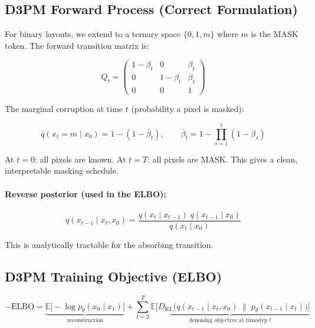 \documentclass[12pt,a4paper]{article}
\theoremstyle{definition}
\theoremstyle{plain}
\theoremstyle{remark}
\begin{document}
\subsection{D3PM Forward Process (Correct Formulation)}

For binary layouts, we extend to a ternary space $\{0, 1, m\}$ where $m$ is the MASK
token.
The forward transition matrix is:

\begin{equation}
  Q_t =
  \begin{pmatrix}
    1 - \beta_t & 0           & \beta_t \\
    0           & 1 - \beta_t & \beta_t \\
    0           & 0           & 1
  \end{pmatrix}
  \label{eq:Qt}
\end{equation}

The marginal corruption at time $t$ (probability a pixel is masked):

\begin{equation}
  \bar{q}(x_t = m \mid x_0) = 1 - (1 - \bar{\beta}_t),
  \qquad
  \bar{\beta}_t = 1 - \prod_{s=1}^t (1 - \beta_s)
  \label{eq:marginal}
\end{equation}

At $t = 0$: all pixels are known.
At $t = T$: all pixels are MASK.
This gives a clean, interpretable masking schedule.

\paragraph{Reverse posterior (used in the ELBO):}

\begin{equation}
  q(x_{t-1} \mid x_t, x_0)
  = \frac{q(x_t \mid x_{t-1})\; q(x_{t-1} \mid x_0)}{q(x_t \mid x_0)}
  \label{eq:reverse_posterior}
\end{equation}

This is analytically tractable for the absorbing transition.

\subsection{D3PM Training Objective (ELBO)}

\begin{equation}
  -\mathrm{ELBO}
  = \underbrace{\mathbb{E}\bigl[-\log p_\theta(x_0 \mid x_1)\bigr]}_{\text{reconstruction}}
  + \sum_{t=2}^{T}
    \underbrace{
      \mathbb{E}\bigl[
        D_{\mathrm{KL}}\!\bigl(
          q(x_{t-1} \mid x_t, x_0)
          \;\|\;
          p_\theta(x_{t-1} \mid x_t)
        \bigr)
      \bigr]
    }_{\text{denoising objective at timestep } t}
  \label{eq:elbo}
\end{equation}
\end{document}
